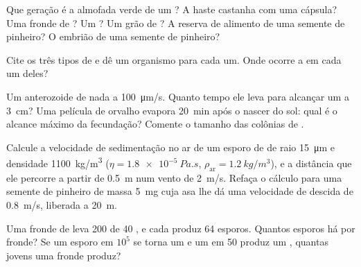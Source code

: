 \begin{exercise}[$\star$]\label{exo:b2:plant-life-cycles:3}
Que geração é a almofada verde de um ? A haste castanha com uma
cápsula? Uma fronde de ? Um ? Um grão de ? A
reserva de alimento de uma semente de pinheiro? O embrião de uma
semente de pinheiro?
\end{exercise}

\begin{exercise}[$\star$]\label{exo:b2:plant-life-cycles:4}
Cite os três tipos de  e dê um organismo para cada um.
Onde ocorre a  em cada um deles?
\end{exercise}

\begin{exercise}[$\star\star$]\label{exo:b2:plant-life-cycles:5}
Um anterozoide de  nada a \qty{100}{\micro m/s}. Quanto tempo ele
leva para alcançar um  a \qty{3}{cm}? Uma película de
orvalho evapora \qty{20}{min} após o nascer do sol: qual é o alcance
máximo da fecundação? Comente o tamanho das colônias de .
\end{exercise}

\begin{exercise}[$\star\star$]\label{exo:b2:plant-life-cycles:6}
Calcule a velocidade de sedimentação no ar de um esporo de  de
raio \qty{15}{\micro m} e densidade \qty{1100}{kg/m^3} ($\eta =
\qty{1.8e-5}{Pa.s}$, $\rho_{\text{ar}} = \qty{1.2}{kg/m^3}$), e a
distância que ele percorre a partir de \qty{0.5}{m} num vento de
\qty{2}{m/s}. Refaça o cálculo para uma semente de pinheiro de massa
\qty{5}{mg} cuja asa lhe dá uma velocidade de descida de
\qty{0.8}{m/s}, liberada a \qty{20}{m}.
\end{exercise}

\begin{exercise}[$\star\star$]\label{exo:b2:plant-life-cycles:7}
Uma fronde de  leva \num{200}  de \num{40} ,
e cada  produz \num{64} esporos. Quantos esporos há por
fronde? Se um esporo em $10^{5}$ se torna um  e um  em
\num{50} produz um , quantas  jovens uma fronde
produz?
\end{exercise}

